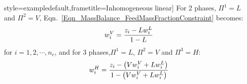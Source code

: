 \begin{mdframed}style=exampledefault,frametitle={Inhomogeneous linear}]%
For 2 phases, $\Pi^{1}=L$ and $\Pi^{2}=V$, Eqn.~\ref{Eqn_MassBalance_FeedMassFractionConstraint} becomes:
\begin{displaymath}
w_{i}^{V} = \displaystyle\frac{z_{i}-Lw_{i}^{L}}{1-L}
\end{displaymath}
for $i=1,2,\cdots,n_{c}$, and for 3 phases,$\Pi^{1}=L$, $\Pi^{2}=V$ and $\Pi^{3}=H$:
\begin{displaymath}
w_{i}^{H} = \displaystyle\frac{z_{i}-\left(V w_{i}^{V} + L w_{i}^{L}\right)}{1 - \left(V w_{i}^{V} + L w_{i}^{L}\right)}
\end{displaymath}
\end{mdframed}
